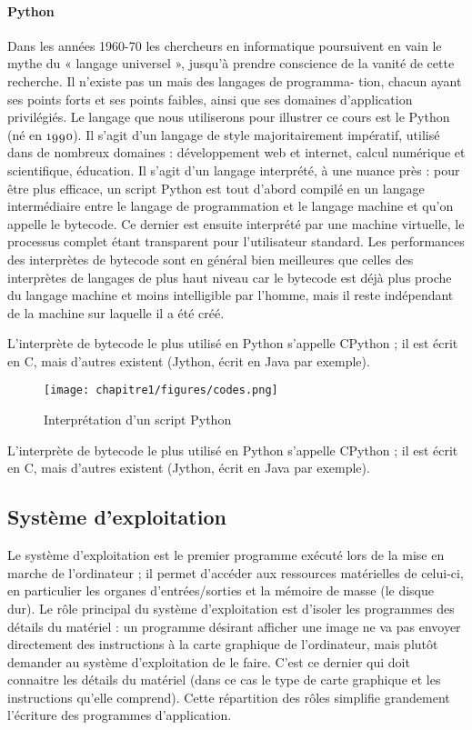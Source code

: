 \paragraph{Python}
Dans les années 1960-70 les chercheurs en informatique poursuivent en vain le mythe du « langage universel »,
jusqu’à prendre conscience de la vanité de cette recherche. Il n’existe pas un mais des langages de programma-
tion, chacun ayant ses points forts et ses points faibles, ainsi que ses domaines d’application privilégiés.
Le langage que nous utiliserons pour illustrer ce cours est le Python (né en ). Il s’agit d’un langage de
style majoritairement impératif, utilisé dans de nombreux domaines : développement web et internet, calcul
numérique et scientifique, éducation. Il s’agit d’un langage interprété, à une nuance près : pour être plus efficace,
un script Python est tout d’abord compilé en un langage intermédiaire entre le langage de programmation et le
langage machine et qu’on appelle le bytecode. Ce dernier est ensuite interprété par une machine virtuelle, le
processus complet étant transparent pour l’utilisateur standard. Les performances des interprètes de bytecode
sont en général bien meilleures que celles des interprètes de langages de plus haut niveau car le bytecode est
déjà plus proche du langage machine et moins intelligible par l’homme, mais il reste indépendant de la machine
sur laquelle il a été créé.

L’interprète de bytecode le plus utilisé en Python s’appelle CPython ; il est écrit en C, mais d’autres existent
(Jython, écrit en Java par exemple).

\begin{figure}
    \centering
    \texttt{[image: chapitre1/figures/codes.png]}
    \caption{Interprétation d’un script Python}
    \label{fig:my_label}
\end{figure}

L’interprète de bytecode le plus utilisé en Python s’appelle CPython ; il est écrit en C, mais d’autres existent
(Jython, écrit en Java par exemple).

\subsection{Système d’exploitation}

Le système d’exploitation est le premier programme exécuté lors de la mise en marche de l’ordinateur ; il permet
d’accéder aux ressources matérielles de celui-ci, en particulier les organes d’entrées/sorties et la mémoire de
masse (le disque dur). Le rôle principal du système d’exploitation est d’isoler les programmes des détails du
matériel : un programme désirant afficher une image ne va pas envoyer directement des instructions à la carte
graphique de l’ordinateur, mais plutôt demander au système d’exploitation de le faire. C’est ce dernier qui doit
connaitre les détails du matériel (dans ce cas le type de carte graphique et les instructions qu’elle comprend).
Cette répartition des rôles simplifie grandement l’écriture des programmes d’application.


